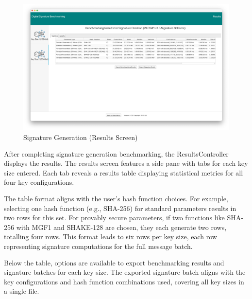 \documentclass[]{final_report}
\theoremstyle{definition}
\begin{document}
\begin{figure}[H]
    \centering
    \includegraphics[scale= 0.325]{main_pictures/ui/signing/signing7-2.png}
    \caption{Signature Generation (Results Screen)}
\end{figure}

After completing signature generation benchmarking, the ResultsController displays the results. The results screen features a side pane with tabs for each key size entered. Each tab reveals a results table displaying statistical metrics for all four key configurations.

The table format aligns with the user's hash function choices. For example, selecting one hash function (e.g., SHA-256) for standard parameters results in two rows for this set. For provably secure parameters, if two functions like SHA-256 with MGF1 and SHAKE-128 are chosen, they each generate two rows, totalling four rows. This format leads to six rows per key size, each row representing signature computations for the full message batch.

Below the table, options are available to export benchmarking results and signature batches for each key size. The exported signature batch aligns with the key configurations and hash function combinations used, covering all key sizes in a single file.
\end{document}
